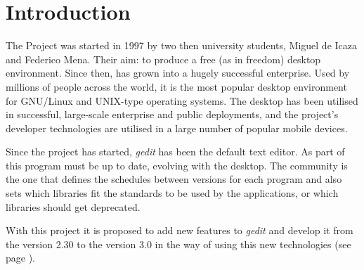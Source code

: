 
\chapter{Introduction}

The \GNOME Project was started in 1997 by two then university students, Miguel de Icaza and Federico Mena. Their aim: to produce a free (as in freedom) desktop environment. Since then, \GNOME has grown into a hugely successful enterprise. Used by millions of people across the world, it is the most popular desktop environment for GNU/Linux and UNIX-type operating systems. The desktop has been utilised in successful, large-scale enterprise and public deployments, and the project’s developer technologies are utilised in a large number of popular mobile devices\cite{website:gnome}.

Since the project has started, \emph{gedit} has been the default text editor. As part of \GNOME this program must be up to date, evolving with the desktop. The \GNOME community is the one that defines the schedules between versions for each program and also sets which libraries fit the standards to be used by the applications, or which libraries should get deprecated.

With this project it is proposed to add new features to \emph{gedit} and develop it from the version 2.30 to the version 3.0 in the way of using this new technologies (see page \pageref{chap:Technologies}).
